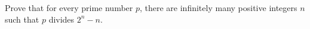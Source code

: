 Prove that for every prime number $p$,  there are infinitely many positive integers $n$ such that $p$ divides $2^n - n$.